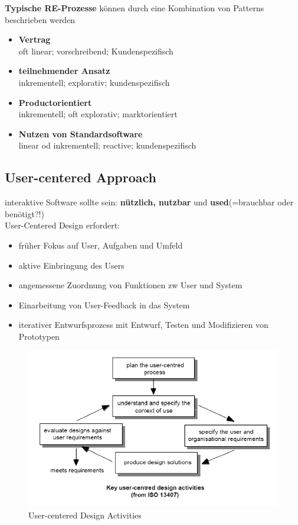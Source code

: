 \textbf{Typische RE-Prozesse} können durch eine Kombination von Patterns beschrieben werden
\begin{itemize}
	\item \textbf{Vertrag}\\
	oft linear; vorschreibend; Kundenspezifisch
	
	\item \textbf{teilnehmender Ansatz}\\
	inkrementell; explorativ; kundenspezifisch
	
	\item \textbf{Productorientiert}\\
	inkrementell; oft explorativ; marktorientiert
	
	\item \textbf{Nutzen von Standardsoftware}\\
	linear od inkrementell; reactive; kundenspezifisch
\end{itemize}

\subsection{User-centered Approach}
interaktive Software sollte sein: \textbf{nützlich, nutzbar} und \textbf{used}(=brauchbar oder benötigt?!)\\
User-Centered Design erfordert:
\begin{itemize}
	\item früher Fokus auf User, Aufgaben und Umfeld
	\item aktive Einbringung des Users
	\item angemessene Zuordnung von Funktionen zw User und System
	\item Einarbeitung von User-Feedback in das System
	\item iterativer Entwurfsprozess mit Entwurf, Testen und Modifizieren von Prototypen
\end{itemize}

\begin{figure}[!h]
	\centering
	\includegraphics[scale=0.7]{img/user_centered_activities.png}
	\caption{User-centered Design Activities}
\end{figure}


